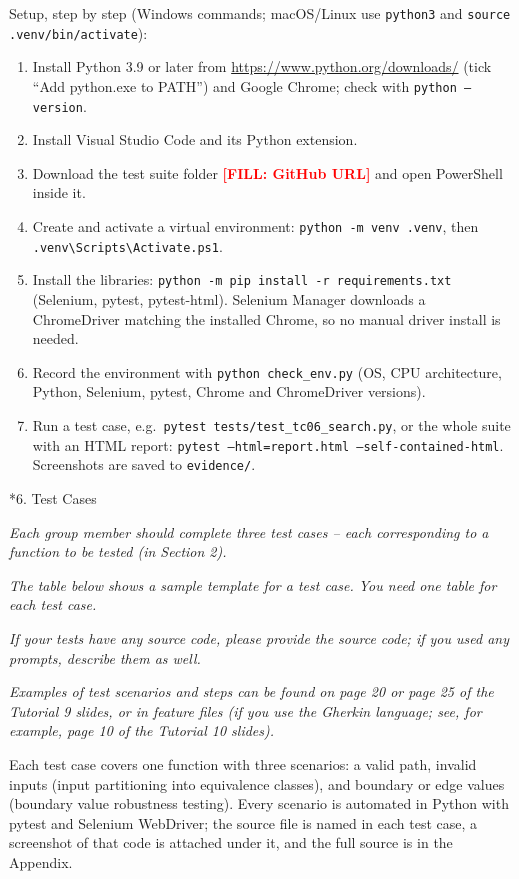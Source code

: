 \documentclass[11pt,a4paper]{article}
\makeatletter
\renewcommand\section{\@startsection{section}{1}{0pt}{3ex plus 1ex}{1.2ex}{\LARGE\bfseries}}
\newcommand{\instr}[1]{{\color{utsblue}\itshape #1\par}}
\newcommand{\FILL}[1]{\textcolor{red}{\textbf{[FILL: #1]}}}
\makeatother
\begin{document}
Setup, step by step (Windows commands; macOS/Linux use \texttt{python3} and \texttt{source .venv/bin/activate}):
\begin{enumerate}[leftmargin=2em, itemsep=1pt]
  \item Install Python 3.9 or later from \url{https://www.python.org/downloads/} (tick ``Add python.exe to PATH'') and Google Chrome; check with \texttt{python --version}.
  \item Install Visual Studio Code and its Python extension.
  \item Download the test suite folder \FILL{GitHub URL} and open PowerShell inside it.
  \item Create and activate a virtual environment: \texttt{python -m venv .venv}, then \texttt{.venv\textbackslash Scripts\textbackslash Activate.ps1}.
  \item Install the libraries: \texttt{python -m pip install -r requirements.txt} (Selenium, pytest, pytest-html). Selenium Manager downloads a ChromeDriver matching the installed Chrome, so no manual driver install is needed.
  \item Record the environment with \texttt{python check\_env.py} (OS, CPU architecture, Python, Selenium, pytest, Chrome and ChromeDriver versions).
  \item Run a test case, e.g.\ \texttt{pytest tests/test\_tc06\_search.py}, or the whole suite with an HTML report: \texttt{pytest --html=report.html --self-contained-html}. Screenshots are saved to \texttt{evidence/}.
\end{enumerate}

\section*{6. Test Cases}
\instr{Each group member should complete three test cases -- each corresponding to a function to be tested (in Section 2).}
\instr{The table below shows a sample template for a test case. You need one table for each test case.}
\instr{If your tests have any source code, please provide the source code; if you used any prompts, describe them as well.}
\instr{Examples of test scenarios and steps can be found on page 20 or page 25 of the Tutorial 9 slides, or in feature files (if you use the Gherkin language; see, for example, page 10 of the Tutorial 10 slides).}

Each test case covers one function with three scenarios: a valid path, invalid inputs (input partitioning into equivalence classes), and boundary or edge values (boundary value robustness testing). Every scenario is automated in Python with pytest and Selenium WebDriver; the source file is named in each test case, a screenshot of that code is attached under it, and the full source is in the Appendix.
\end{document}
